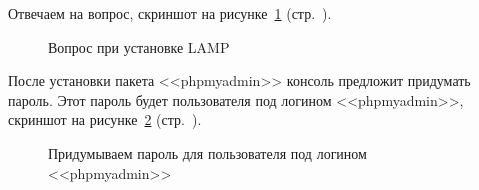 Отвечаем на вопрос, скриншот на рисунке~\ref{fig:sudo-apt-install-apache2-step-3} (стр.~\pageref{fig:sudo-apt-install-apache2-step-3}).

\begin{figure}[!htp]
    \caption{Вопрос при установке LAMP}
    \label{fig:sudo-apt-install-apache2-step-3}
\end{figure}

После установки пакета <<phpmyadmin>> консоль предложит придумать пароль. Этот пароль будет пользователя под логином <<phpmyadmin>>, скриншот на рисунке~\ref{fig:sudo-apt-install-apache2-step-4} (стр.~\pageref{fig:sudo-apt-install-apache2-step-4}).

\begin{figure}[!htp]
    \caption{Придумываем пароль для пользователя под логином <<phpmyadmin>>}
    \label{fig:sudo-apt-install-apache2-step-4}
\end{figure}

